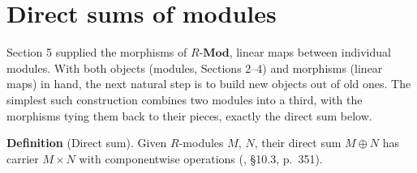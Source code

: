 \section{Direct sums of modules}\label{sec:11-modules:06-direct-sums:1}

Section 5 supplied the morphisms of \(R\text{-}\mathbf{Mod}\), linear maps between individual modules. With both objects (modules, Sections 2--4) and morphisms (linear maps) in hand, the next natural step is to build new objects out of old ones. The simplest such construction combines two modules into a third, with the morphisms tying them back to their pieces, exactly the direct sum below.

\textbf{Definition} (Direct sum). Given \(R\)-modules \(M\), \(N\), their direct sum \(M \oplus N\) has carrier \(M \times N\) with componentwise operations (\cite{DummitFoote2003}, §10.3, p.~351).

